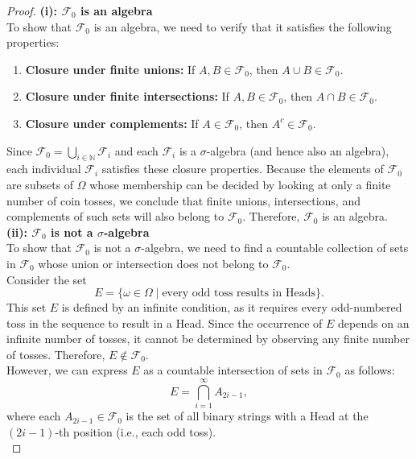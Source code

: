\begin{proof}
    \textbf{(i): \( \mathcal{F}_0 \) is an algebra}\\

    To show that \( \mathcal{F}_0 \) is an algebra, we need to verify that it satisfies the following properties:

    \begin{enumerate}
        \item \textbf{Closure under finite unions:} If \( A, B \in \mathcal{F}_0 \), then \( A \cup B \in \mathcal{F}_0 \).
        \item \textbf{Closure under finite intersections:} If \( A, B \in \mathcal{F}_0 \), then \( A \cap B \in \mathcal{F}_0 \).
        \item \textbf{Closure under complements:} If \( A \in \mathcal{F}_0 \), then \( A^c \in \mathcal{F}_0 \).
    \end{enumerate}

    Since \( \mathcal{F}_0 = \bigcup_{i \in \mathbb{N}} \mathcal{F}_i \) and each \( \mathcal{F}_i \) is a $\sigma$-algebra (and hence also an algebra), each individual \( \mathcal{F}_i \) satisfies these closure properties. Because the elements of \( \mathcal{F}_0 \) are subsets of $\Omega$ whose membership can be decided by looking at only a finite number of coin tosses, we conclude that finite unions, intersections, and complements of such sets will also belong to \( \mathcal{F}_0 \). Therefore, \( \mathcal{F}_0 \) is an algebra.\\

    \textbf{(ii): \( \mathcal{F}_0 \) is not a $\sigma$-algebra}\\

    To show that \( \mathcal{F}_0 \) is not a $\sigma$-algebra, we need to find a countable collection of sets in \( \mathcal{F}_0 \) whose union or intersection does not belong to \( \mathcal{F}_0 \).\\

Consider the set
\[
E = \{\omega \in \Omega \mid \text{every odd toss results in Heads}\}.
\]
This set \( E \) is defined by an infinite condition, as it requires every odd-numbered toss in the sequence to result in a Head. Since the occurrence of \( E \) depends on an infinite number of tosses, it cannot be determined by observing any finite number of tosses. Therefore, \( E \notin \mathcal{F}_0 \).\\

However, we can express \( E \) as a countable intersection of sets in \( \mathcal{F}_0 \) as follows:
\[
E = \bigcap_{i=1}^{\infty} A_{2i-1},
\]
where each \( A_{2i-1} \in \mathcal{F}_0 \) is the set of all binary strings with a Head at the \( (2i-1) \)-th position (i.e., each odd toss).\\


\end{proof}
